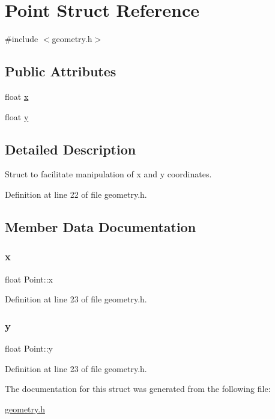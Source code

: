 \hypertarget{structPoint}{}\section{Point Struct Reference}
\label{structPoint}


{\ttfamily \#include $<$geometry.\+h$>$}

\subsection*{Public Attributes}
\begin{DoxyCompactItemize}
\item 
float \hyperlink{structPoint_a05dfe2dfbde813ad234b514f30e662f1}{x}
\item 
float \hyperlink{structPoint_a6101960c8d2d4e8ea1d32c9234bbeb8d}{y}
\end{DoxyCompactItemize}


\subsection{Detailed Description}
Struct to facilitate manipulation of x and y coordinates. 

Definition at line 22 of file geometry.\+h.



\subsection{Member Data Documentation}
\mbox{\label{structPoint_a05dfe2dfbde813ad234b514f30e662f1}} 
\subsubsection{\texorpdfstring{x}{x}}
{\footnotesize\ttfamily float Point\+::x}



Definition at line 23 of file geometry.\+h.

\mbox{\label{structPoint_a6101960c8d2d4e8ea1d32c9234bbeb8d}} 
\subsubsection{\texorpdfstring{y}{y}}
{\footnotesize\ttfamily float Point\+::y}



Definition at line 23 of file geometry.\+h.



The documentation for this struct was generated from the following file\+:\begin{DoxyCompactItemize}
\item 
\hyperlink{geometry_8h}{geometry.\+h}\end{DoxyCompactItemize}
